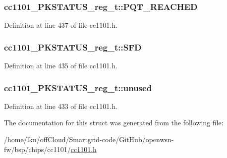 \subsubsection[{\texorpdfstring{P\+Q\+T\+\_\+\+R\+E\+A\+C\+H\+ED}{PQT_REACHED}}]{ cc1101\+\_\+\+P\+K\+S\+T\+A\+T\+U\+S\+\_\+reg\+\_\+t\+::\+P\+Q\+T\+\_\+\+R\+E\+A\+C\+H\+ED}\hypertarget{structcc1101___p_k_s_t_a_t_u_s__reg__t_a40e313549d9942d860f46f12068f68b9}{}\label{structcc1101___p_k_s_t_a_t_u_s__reg__t_a40e313549d9942d860f46f12068f68b9}


Definition at line 437 of file cc1101.\+h.

\subsubsection[{\texorpdfstring{S\+FD}{SFD}}]{ cc1101\+\_\+\+P\+K\+S\+T\+A\+T\+U\+S\+\_\+reg\+\_\+t\+::\+S\+FD}\hypertarget{structcc1101___p_k_s_t_a_t_u_s__reg__t_a937a7423c129422a7b0480e965890324}{}\label{structcc1101___p_k_s_t_a_t_u_s__reg__t_a937a7423c129422a7b0480e965890324}


Definition at line 435 of file cc1101.\+h.

\subsubsection[{\texorpdfstring{unused}{unused}}]{ cc1101\+\_\+\+P\+K\+S\+T\+A\+T\+U\+S\+\_\+reg\+\_\+t\+::unused}\hypertarget{structcc1101___p_k_s_t_a_t_u_s__reg__t_a4e9c2a3b1591d059a29196ed4da79682}{}\label{structcc1101___p_k_s_t_a_t_u_s__reg__t_a4e9c2a3b1591d059a29196ed4da79682}


Definition at line 433 of file cc1101.\+h.



The documentation for this struct was generated from the following file\+:\begin{DoxyCompactItemize}
\item 
/home/lkn/off\+Cloud/\+Smartgrid-\/code/\+Git\+Hub/openwsn-\/fw/bsp/chips/cc1101/\hyperlink{cc1101_8h}{cc1101.\+h}\end{DoxyCompactItemize}
